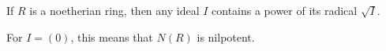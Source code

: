 If $R$ is a noetherian ring, then any ideal $I$ contains a power of its
radical $\sqrt{I}$.

For $I = (0)$, this means that $N(R)$ is nilpotent.
